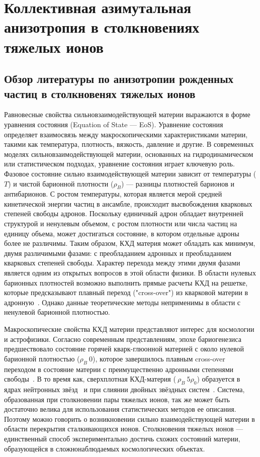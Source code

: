 \chapter{Коллективная азимутальная анизотропия в столкновениях тяжелых ионов} \label{chapt1}

\section{Обзор литературы по анизотропии рожденных частиц в столкновенях тяжелых ионов}

Равновесные свойства сильновзаимодействующей материи выражаются в форме уравнения состояния (Equation of State — EoS). 
Уравнение состояния определяет взаимосвязь между макроскопическими характеристиками материи, такими как температура, плотность, вязкость, давление и другие.
В современных моделях сильновзаимодействующей материи, основанных на гидродинамическом или статистическом подходах, уравнение состояния играет ключевую роль.
Фазовое состояние сильно взаимодействующей материи зависит от температуры ($T$) и чистой барионной плотности ($\rho_B$) --- разницы плотностей барионов и антибарионов.
С ростом температуры, которая является мерой средней кинетической энергии частиц в ансамбле, происходит высвобождения кварковых степеней свободы адронов.
Поскольку единичный адрон обладает внутренней структурой и ненулевым объемом, с ростом плотности или числа частиц на единицу объема, может достигаться состояние, в котором отдельные адроны более не различимы.
Таким образом, КХД материя может обладать как минимум, двумя различимыми фазами: с преобладанием адронных и преобладанием кварковых степеней свободы.
Характер перехода между этими двумя фазами является одним из открытых вопросов в этой области физики.
В области нулевых барионных плотностей возможно выполнить прямые расчеты КХД на решетке, которые предсказывают плавный переход ("cross-over") из кварковой материи в адронную~\cite{Esumi:2022uas}.
Однако данные теоретические методы неприменимы в области с ненулевой барионной плотностью.


Макроскопические свойства КХД материи представляют интерес для космологии и астрофизики. 
Согласно современным представлениям, эпохе бариогенезиса предшествовало состояние горячей кварк-глюонной материей с около нулевой барионной плотностью ($\rho_B~0$), которое завершилось плавным cross-over переходом в состояние материи с преимущественно адронными степенями свободы~\cite{Esumi:2022uas}.
В то время как, сверхплотная КХД-материя ($~\rho_B ~ 5\rho_0$) образуется в ядрах нейтронных звёзд~\cite{Danielewicz:2002pu} и при слиянии двойных звёздных систем~\cite{Adamczewski-Musch:2019byl}.
Система, образованная при столкновении пары тяжелых ионов, так же может быть достаточно велика для использования статистических методов ее описания.
Поэтому можно говорить о возникновении сильно взаимодействующей материи в области перекрытия сталкивающихся ионов.
Столкновения тяжелых ионов --- единственный способ экспериментально достичь схожих состояний материи, образующейся в сложнонаблюдаемых космологических объектах.


